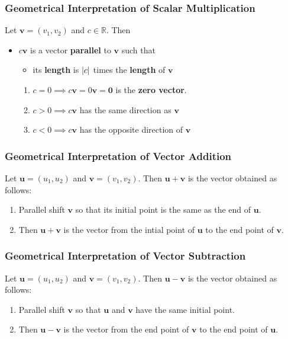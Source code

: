 \documentclass[../ma2001_notes.tex]{subfiles}
\begin{document}
\subsubsection{Geometrical Interpretation of Scalar Multiplication}
Let \(\bm{v}=(v_1,v_2)\) and \(c\in\mathbb{R}\). Then
\begin{itemize}
	\item\(c\bm{v}\) is a vector \textbf{parallel} to \(\bm{v}\) such that
	\begin{itemize}
		\item its \textbf{length} is \(\lvert c\rvert\) times the \textbf{length} of \(\bm{v}\)
	\end{itemize}
	\begin{enumerate}
		\item\(c=0\implies c\bm{v}=0\bm{v}=\bm{0}\) is the \textbf{zero vector}.
		\item\(c>0\implies c\bm{v}\) has the same direction as \(\bm{v}\)
		\item\(c<0\implies c\bm{v}\) has the opposite direction of \(\bm{v}\)
	\end{enumerate}
\end{itemize}

\subsubsection{Geometrical Interpretation of Vector Addition}
Let \(\bm{u}=(u_1,u_2)\) and \(\bm{v}=(v_1,v_2)\). Then \(\bm{u}+\bm{v}\) is the vector obtained as follows:
\begin{enumerate}
	\item Parallel shift \(\bm{v}\) so that its initial point is the same as the end of \(\bm{u}\).
	\item Then \(\bm{u}+\bm{v}\) is the vector from the intial point of \(\bm{u}\) to the end point of \(\bm{v}\).
\end{enumerate}

\subsubsection{Geometrical Interpretation of Vector Subtraction}
Let \(\bm{u}=(u_1,u_2)\) and \(\bm{v}=(v_1,v_2)\). Then \(\bm{u}-\bm{v}\) is the vector obtained as follows:
\begin{enumerate}
	\item Parallel shift \(\bm{v}\) so that \(\bm{u}\) and \(\bm{v}\) have the same initial point.
	\item Then \(\bm{u}-\bm{v}\) is the vector from the end point of \(\bm{v}\) to the end point of \(\bm{u}\).
\end{enumerate}
\end{document}
